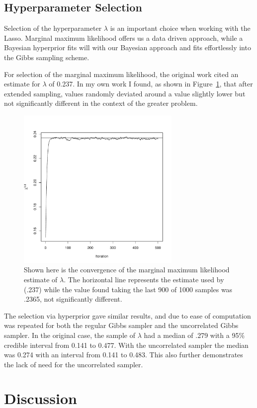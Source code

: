 \documentclass{uwstat572}
\begin{document}
\subsection{Hyperparameter Selection}
Selection of the hyperparameter $\lambda$ is an important choice when working with the Lasso. Marginal maximum likelihood offers us a data driven approach, while a Bayesian hyperprior fits will with our Bayesian approach and fits effortlessly into the Gibbs sampling scheme.

For selection of the marginal maximum likelihood, the original work cited an estimate for $\lambda$ of 0.237. In my own work I found, as shown in Figure~\ref{lambda}, that after extended sampling, values randomly deviated around a value slightly lower but not significantly different in the context of the greater problem.

\begin{figure}\label{lambda}
  \centering
    \includegraphics[width=0.7\textwidth]{SaveLambdaConverge.pdf}
  \caption{Shown here is the convergence of the marginal maximum likelihood estimate of $\lambda$. The horizontal line represents the estimate used by \cite{park2008bayesian} (.237) while the value found taking the last 900 of 1000 samples was .2365, not significantly different.}
\end{figure}

The selection via hyperprior gave similar results, and due to ease of computation was repeated for both the regular Gibbs sampler and the uncorrelated Gibbs sampler. In the original case, the sample of $\lambda$ had a median of .279 with a 95\% credible interval from 0.141 to 0.477. With the uncorrelated sampler the median was 0.274 with an interval from 0.141 to 0.483. This also further demonstrates the lack of need for the uncorrelated sampler.

\section{Discussion}


\end{document}
